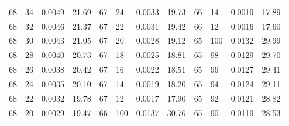 \begin{tabular}{llll|llll|llll}
68 & 34 & 0.0049 & 21.69 & 67 & 24 & 0.0033 & 19.73 & 66 & 14 & 0.0019 & 17.89\\
68 & 32 & 0.0046 & 21.37 & 67 & 22 & 0.0031 & 19.42 & 66 & 12 & 0.0016 & 17.60\\
68 & 30 & 0.0043 & 21.05 & 67 & 20 & 0.0028 & 19.12 & 65 & 100 & 0.0132 & 29.99\\
68 & 28 & 0.0040 & 20.73 & 67 & 18 & 0.0025 & 18.81 & 65 & 98 & 0.0129 & 29.70\\
68 & 26 & 0.0038 & 20.42 & 67 & 16 & 0.0022 & 18.51 & 65 & 96 & 0.0127 & 29.41\\
68 & 24 & 0.0035 & 20.10 & 67 & 14 & 0.0019 & 18.20 & 65 & 94 & 0.0124 & 29.11\\
68 & 22 & 0.0032 & 19.78 & 67 & 12 & 0.0017 & 17.90 & 65 & 92 & 0.0121 & 28.82\\
68 & 20 & 0.0029 & 19.47 & 66 & 100 & 0.0137 & 30.76 & 65 & 90 & 0.0119 & 28.53\\
\bottomrule
\end{tabular}
\newpage
